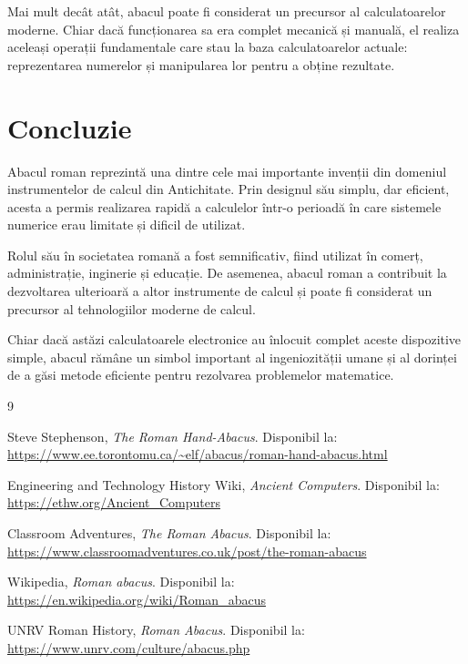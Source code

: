 \documentclass[12pt,a4paper]{article}
\begin{document}
Mai mult decât atât, abacul poate fi considerat un precursor al calculatoarelor moderne. Chiar dacă funcționarea sa era complet mecanică și manuală, el realiza aceleași operații fundamentale care stau la baza calculatoarelor actuale: reprezentarea numerelor și manipularea lor pentru a obține rezultate. \cite{romanabacuswiki}

\section*{Concluzie}

Abacul roman reprezintă una dintre cele mai importante invenții din domeniul instrumentelor de calcul din Antichitate. Prin designul său simplu, dar eficient, acesta a permis realizarea rapidă a calculelor într-o perioadă în care sistemele numerice erau limitate și dificil de utilizat.

Rolul său în societatea romană a fost semnificativ, fiind utilizat în comerț, administrație, inginerie și educație. De asemenea, abacul roman a contribuit la dezvoltarea ulterioară a altor instrumente de calcul și poate fi considerat un precursor al tehnologiilor moderne de calcul.

Chiar dacă astăzi calculatoarele electronice au înlocuit complet aceste dispozitive simple, abacul rămâne un simbol important al ingeniozității umane și al dorinței de a găsi metode eficiente pentru rezolvarea problemelor matematice.

\newpage

\begin{thebibliography}{9}

Steve Stephenson, \textit{The Roman Hand-Abacus}.  
Disponibil la: \url{https://www.ee.torontomu.ca/~elf/abacus/roman-hand-abacus.html}

Engineering and Technology History Wiki, \textit{Ancient Computers}.  
Disponibil la: \url{https://ethw.org/Ancient_Computers}

Classroom Adventures, \textit{The Roman Abacus}.  
Disponibil la: \url{https://www.classroomadventures.co.uk/post/the-roman-abacus}

Wikipedia, \textit{Roman abacus}.  
Disponibil la: \url{https://en.wikipedia.org/wiki/Roman_abacus}

UNRV Roman History, \textit{Roman Abacus}.  
Disponibil la: \url{https://www.unrv.com/culture/abacus.php}

\end{thebibliography}
\end{document}
